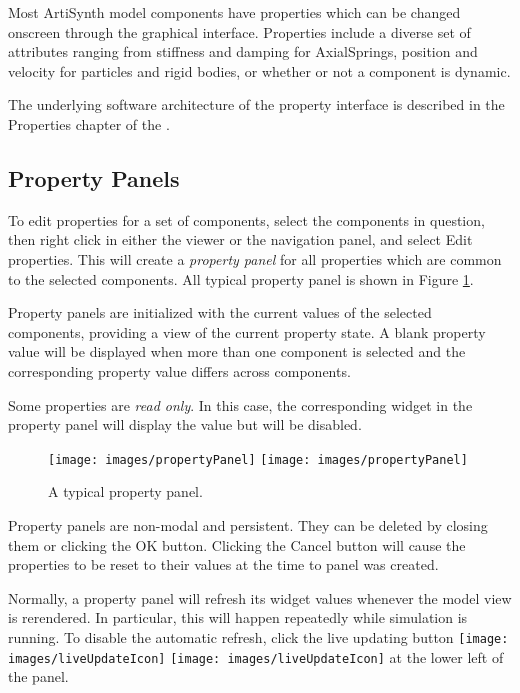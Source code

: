 \documentclass{article}
\begin{document}
Most ArtiSynth model components have properties which can be 
changed onscreen through the graphical interface. Properties
include a diverse set of attributes ranging from stiffness and
damping for AxialSprings, position and velocity for particles and
rigid bodies, or whether or not a component is dynamic.

The underlying software architecture of the property interface is 
described in the Properties chapter of the 
.

\subsection{Property Panels}
\label{propertyPanelsSec}

To edit properties for a set of components, select the components in
question, then right click in either the viewer or the navigation
panel, and select {\sf Edit properties}. This will create a {\it property
panel} for all properties which are common to the selected components.
All typical property panel is shown in Figure \ref{propertyPanelFig}.

Property panels are initialized with the current values of the selected
components, providing a view of the current property state. A blank
property value will be displayed when more than one component is selected and 
the corresponding property value differs across components.

Some properties are {\it read only}. In this case, the corresponding
widget in the property panel will display the value but will be
disabled.

\begin{figure}
\begin{center}
\iflatexml
\texttt{[image: images/propertyPanel]}
\else
\texttt{[image: images/propertyPanel]}
\fi
\end{center}
\caption{A typical property panel.}%
\label{propertyPanelFig}
\end{figure}

Property panels are non-modal and persistent. 
They can be deleted by
closing them or clicking the {\sf OK} button. Clicking the {\sf Cancel} button
will cause the properties to be reset to their values at the time to
panel was created.

Normally, a property panel will refresh its widget values whenever the
model view is rerendered. In particular, this will happen repeatedly
while simulation is running. To disable the automatic refresh, click
the {\sf live updating} button 
\iflatexml
\texttt{[image: images/liveUpdateIcon]}
\else
\texttt{[image: images/liveUpdateIcon]}
\fi
at the lower
left of the panel.
\end{document}

